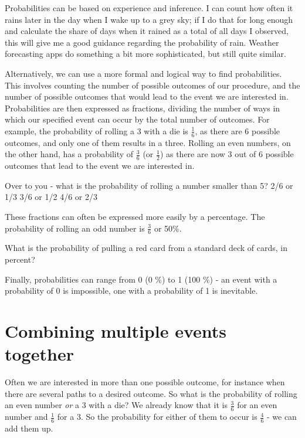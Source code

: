 \documentclass[
]{book}
\begin{document}
Probabilities can be based on experience and inference. I can count how often it rains later in the day when I wake up to a grey sky; if I do that for long enough and calculate the share of days when it rained as a total of all days I observed, this will give me a good guidance regarding the probability of rain. Weather forecasting apps do something a bit more sophisticated, but still quite similar.

Alternatively, we can use a more formal and logical way to find probabilities. This involves counting the number of possible outcomes of our procedure, and the number of possible outcomes that would lead to the event we are interested in. Probabilities are then expressed as fractions, dividing the number of ways in which our specified event can occur by the total number of outcomes. For example, the probability of rolling a 3 with a die is \(\frac{1}{6}\), as there are 6 possible outcomes, and only one of them results in a three. Rolling an even numbers, on the other hand, has a probability of \(\frac{3}{6}\) (or \(\frac{1}{2}\)) as there are now 3 out of 6 possible outcomes that lead to the event we are interested in.

Over to you - what is the probability of rolling a number smaller than 5? 2/6 or 1/3 3/6 or 1/2 4/6 or 2/3

These fractions can often be expressed more easily by a percentage. The probability of rolling an odd number is \(\frac{3}{6}\) or 50\%.

What is the probability of pulling a red card from a standard deck of cards, in percent?

Finally, probabilities can range from 0 (0 \%) to 1 (100 \%) - an event with a probability of 0 is impossible, one with a probability of 1 is inevitable.

\hypertarget{combining-multiple-events-together}{%
\section{Combining multiple events together}\label{combining-multiple-events-together}}

Often we are interested in more than one possible outcome, for instance when there are several paths to a desired outcome. So what is the probability of rolling an even number \emph{or} a 3 with a die? We already know that it is \(\frac{3}{6}\) for an even number and \(\frac{1}{6}\) for a 3. So the probability for either of them to occur is \(\frac{4}{6}\) - we can add them up.
\end{document}
